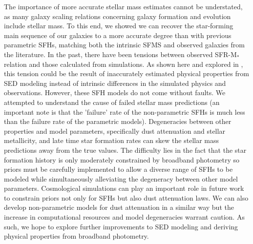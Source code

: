 \documentclass[twocolumn]{aastex62}
\begin{document}
The importance of more accurate stellar mass estimates cannot be understated, as many galaxy scaling relations concerning galaxy formation and evolution include stellar mass. To this end, we showed we can recover the star-forming main sequence of our galaxies to a more accurate degree than with previous parametric SFHs, matching both the intrinsic SFMS and observed galaxies from the literature. In the past, there have been tensions between observed SFR-M$_*$ relation and those calculated from simulations. As shown here and explored in \cite{katsianis_high_2020}, this tension could be the result of inaccurately estimated physical properties from SED modeling instead of intrinsic differences in the simulated physics and observations. However, these SFH models do not come without faults. We attempted to understand the cause of failed stellar mass predictions (an important note is that the 'failure' rate of the non-parametric SFHs is much less than the failure rate of the parametric models). Degeneracies between other properties and model parameters, specifically dust attenuation and stellar metallicity, and late time star formation rates can skew the stellar mass predictions away from the true values. The difficulty lies in the fact that the star formation history is only moderately constrained by broadband photometry so priors must be carefully implemented to allow a diverse range of SFHs to be modeled while simultaneously alleviating the degeneracy between other model parameters. Cosmological simulations can play an important role in future work to constrain priors not only for SFHs but also dust attenuation laws. We can also develop non-parametric models for dust attenuation in a similar way but the increase in computational resources and model degeneracies warrant caution. As such, we hope to explore further improvements to SED modeling and deriving physical properties from broadband photometry.  




{}
\end{document}
